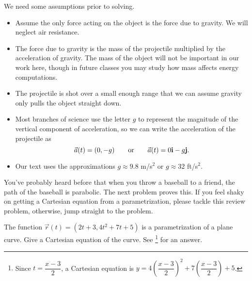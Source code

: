 We need some assumptions prior to solving. 
\begin{itemize}
 \item Assume the only force acting on the object is the force due to gravity. We will neglect air resistance. 
 \item The force due to gravity is the mass of the projectile multiplied by the acceleration of gravity. The mass of the object will not be important in our work here, though in future classes you may study how mass affects energy computations. 
 \item The projectile is shot over a small enough range that we can assume gravity only pulls the object straight down.
 \item Most branches of science use the letter $g$ to represent the magnitude of the vertical component of acceleration, so we can write the acceleration of the projectile as 
$$\vec a(t) = (0,-g) \quad \quad \text{or}\quad \quad \vec a(t)= 0{\bf i}-g{\bf j}.$$ 
 \item Our text uses the approximations $g\approx 9.8$ m/s$^2$ or $g\approx32$ ft/s$^2$. 
\end{itemize}


You've probably heard before that when you throw a baseball to a friend, the path of the baseball is parabolic. The next problem proves this. If you feel shaky on getting a Cartesian equation from a parametrization, please tackle this review problem, otherwise, jump straight to the problem.
\begin{review*}
 The function $\vec r(t) = (2t+3, 4t^2+7t+5)$ is a parametrization of a plane curve.  Give a Cartesian equation of the curve. 
 See \footnote{Since $t=\dfrac{x-3}{2}$, a Cartesian equation is $y = 4\left(\dfrac{x-3}{2}\right)^2+7\left(\dfrac{x-3}{2}\right)+5$. } for an answer.
\end{review*}



